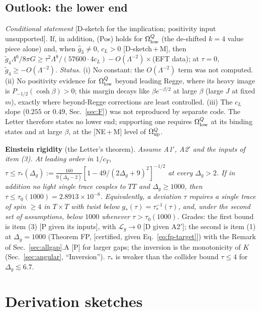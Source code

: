 \documentclass[aps,prl,onecolumn,superscriptaddress,nofootinbib]{revtex4-2}
\begin{document}
\subsection{Outlook: the lower end}
\label{sec:lower}
\emph{Conditional statement} [D-sketch for the implication; positivity input unsupported]. If, in addition,
(Pos) holds for $\Omega^Q_{\rm low}$ (the de-shifted $k=4$ value piece alone) and, when $\hat g_3\ne0$, $c_L>0$
[D-sketch\,+\,M], then $\tilde g_4\Lambda^6/8\pi G\ge\tau^2\Lambda^8/(57600\cdot4c_L)-O(\Lambda^{-2})\times$(EFT data); at $\tau=0$,
$\tilde g_4\ge-O(\Lambda^{-2})$. \emph{Status.} (i) No constant: the $O(\Lambda^{-2})$ term was not computed. (ii) No
positivity evidence for $\Omega^Q_{\rm low}$ beyond leading Regge, where its heavy image is $P_{-1/2}(\cosh\beta)>0$; this
margin decays like $\beta e^{-\beta/2}$ at large $\beta$ (large $J$ at fixed $m$), exactly where beyond-Regge corrections
are least controlled. (iii) The $c_L$ slope ($0.255$ or $0.49$, Sec.~\ref{sec:F}) was not reproduced
by separate code. The Letter therefore states no lower end; supporting one requires $\Omega^Q_{\rm low}$ at its binding states and at large $\beta$, at the [NE\,+\,M] level of $\Omega^Q_{\rm up}$.

\textbf{Einstein rigidity} (the Letter's theorem). \emph{Assume A1$'$, A2$'$ and the inputs of item (3). At leading order in
$1/c_T$, $\tau\le\tau_*(\Delta_g):=\frac{160}{9(\Delta_g-2)}[1-49/(2\Delta_g+9)^2]^{-1/2}$ at every $\Delta_g>2$. If in addition no light
single trace couples to $TT$ and $\Delta_g\ge1000$, then $\tau\le\tau_0(1000)=2.8913\times10^{-8}$. Equivalently, a deviation $\tau$
requires a single trace of spin $\ge4$ in $T\times T$ with twist below $g_*(\tau)=\tau_*^{-1}(\tau)$, and, under the second set of
assumptions, below $1000$ whenever $\tau>\tau_0(1000)$.} Grades: the first bound is item (3) [P given its inputs], with $\mathcal L_g\to0$ [D given A2$'$]; the second is item (1)
at $\Delta_g=1000$ (Theorem FP, [certified, given Eq.~\eqref{eq:fp-target}]) with the Remark of Sec.~\ref{sec:allgap}.A [P] for
larger gaps; the inversion is the monotonicity of $K$ (Sec.~\ref{sec:angular}, ``Inversion''). $\tau_*$ is weaker than the
collider bound $\tau\le4$ for $\Delta_g\lesssim6.7$.

\section{Derivation sketches}
\label{sec:deriv}
\end{document}
